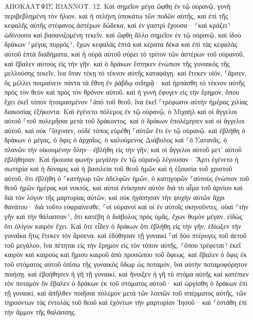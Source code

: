 \documentclass[twoside, 9pt]{extreport}
\begin{document}
ΑΠΟΚΑΛΥΨΙΣ ΙΩΑΝΝΟΥ.
12.
Καὶ σημεῖον μέγα ὤφθη ἐν τῷ οὐρανῷ, γυνὴ περιβεβλημένη τὸν ἥλιον, καὶ ἡ σελήνη ὑποκάτω τῶν ποδῶν αὐτῆς, καὶ ἐπὶ τῆς κεφαλῆς αὐτῆς στέφανος ἀστέρων δώδεκα, 
καὶ ἐν γαστρὶ ἔχουσα· ⸂καὶ κράζει⸃ ὠδίνουσα καὶ βασανιζομένη τεκεῖν. 
καὶ ὤφθη ἄλλο σημεῖον ἐν τῷ οὐρανῷ, καὶ ἰδοὺ δράκων ⸂μέγας πυρρός⸃, ἔχων κεφαλὰς ἑπτὰ καὶ κέρατα δέκα καὶ ἐπὶ τὰς κεφαλὰς αὐτοῦ ἑπτὰ διαδήματα, 
καὶ ἡ οὐρὰ αὐτοῦ σύρει τὸ τρίτον τῶν ἀστέρων τοῦ οὐρανοῦ, καὶ ἔβαλεν αὐτοὺς εἰς τὴν γῆν. καὶ ὁ δράκων ἕστηκεν ἐνώπιον τῆς γυναικὸς τῆς μελλούσης τεκεῖν, ἵνα ὅταν τέκῃ τὸ τέκνον αὐτῆς καταφάγῃ. 
καὶ ἔτεκεν υἱόν, ⸀ἄρσεν, ὃς μέλλει ποιμαίνειν πάντα τὰ ἔθνη ἐν ῥάβδῳ σιδηρᾷ· καὶ ἡρπάσθη τὸ τέκνον αὐτῆς πρὸς τὸν θεὸν καὶ πρὸς τὸν θρόνον αὐτοῦ. 
καὶ ἡ γυνὴ ἔφυγεν εἰς τὴν ἔρημον, ὅπου ἔχει ἐκεῖ τόπον ἡτοιμασμένον ⸀ἀπὸ τοῦ θεοῦ, ἵνα ἐκεῖ ⸀τρέφωσιν αὐτὴν ἡμέρας χιλίας διακοσίας ἑξήκοντα. 
Καὶ ἐγένετο πόλεμος ἐν τῷ οὐρανῷ, ὁ Μιχαὴλ καὶ οἱ ἄγγελοι αὐτοῦ ⸀τοῦ πολεμῆσαι μετὰ τοῦ δράκοντος. καὶ ὁ δράκων ἐπολέμησεν καὶ οἱ ἄγγελοι αὐτοῦ, 
καὶ οὐκ ⸀ἴσχυσεν, οὐδὲ τόπος εὑρέθη ⸀αὐτῶν ἔτι ἐν τῷ οὐρανῷ. 
καὶ ἐβλήθη ὁ δράκων ὁ μέγας, ὁ ὄφις ὁ ἀρχαῖος, ὁ καλούμενος Διάβολος καὶ ⸀ὁ Σατανᾶς, ὁ πλανῶν τὴν οἰκουμένην ὅλην—ἐβλήθη εἰς τὴν γῆν, καὶ οἱ ἄγγελοι αὐτοῦ μετ᾽ αὐτοῦ ἐβλήθησαν. 
Καὶ ἤκουσα φωνὴν μεγάλην ἐν τῷ οὐρανῷ λέγουσαν· Ἄρτι ἐγένετο ἡ σωτηρία καὶ ἡ δύναμις καὶ ἡ βασιλεία τοῦ θεοῦ ἡμῶν καὶ ἡ ἐξουσία τοῦ χριστοῦ αὐτοῦ, ὅτι ἐβλήθη ὁ ⸀κατήγωρ τῶν ἀδελφῶν ἡμῶν, ὁ κατηγορῶν ⸀αὐτοὺς ἐνώπιον τοῦ θεοῦ ἡμῶν ἡμέρας καὶ νυκτός. 
καὶ αὐτοὶ ἐνίκησαν αὐτὸν διὰ τὸ αἷμα τοῦ ἀρνίου καὶ διὰ τὸν λόγον τῆς μαρτυρίας αὐτῶν, καὶ οὐκ ἠγάπησαν τὴν ψυχὴν αὐτῶν ἄχρι θανάτου· 
διὰ τοῦτο εὐφραίνεσθε, ⸀οἱ οὐρανοὶ καὶ οἱ ἐν αὐτοῖς σκηνοῦντες. οὐαὶ ⸂τὴν γῆν καὶ τὴν θάλασσαν⸃, ὅτι κατέβη ὁ διάβολος πρὸς ὑμᾶς, ἔχων θυμὸν μέγαν, εἰδὼς ὅτι ὀλίγον καιρὸν ἔχει. 
Καὶ ὅτε εἶδεν ὁ δράκων ὅτι ἐβλήθη εἰς τὴν γῆν, ἐδίωξεν τὴν γυναῖκα ἥτις ἔτεκεν τὸν ἄρσενα. 
καὶ ἐδόθησαν τῇ γυναικὶ ⸀αἱ δύο πτέρυγες τοῦ ἀετοῦ τοῦ μεγάλου, ἵνα πέτηται εἰς τὴν ἔρημον εἰς τὸν τόπον αὐτῆς, ⸂ὅπου τρέφεται⸃ ἐκεῖ καιρὸν καὶ καιροὺς καὶ ἥμισυ καιροῦ ἀπὸ προσώπου τοῦ ὄφεως. 
καὶ ἔβαλεν ὁ ὄφις ἐκ τοῦ στόματος αὐτοῦ ὀπίσω τῆς γυναικὸς ὕδωρ ὡς ποταμόν, ἵνα αὐτὴν ποταμοφόρητον ποιήσῃ. 
καὶ ἐβοήθησεν ἡ γῆ τῇ γυναικί, καὶ ἤνοιξεν ἡ γῆ τὸ στόμα αὐτῆς καὶ κατέπιεν τὸν ποταμὸν ὃν ἔβαλεν ὁ δράκων ἐκ τοῦ στόματος αὐτοῦ· 
καὶ ὠργίσθη ὁ δράκων ἐπὶ τῇ γυναικί, καὶ ἀπῆλθεν ποιῆσαι πόλεμον μετὰ τῶν λοιπῶν τοῦ σπέρματος αὐτῆς, τῶν τηρούντων τὰς ἐντολὰς τοῦ θεοῦ καὶ ἐχόντων τὴν μαρτυρίαν Ἰησοῦ· 
καὶ ⸀ἐστάθη ἐπὶ τὴν ἄμμον τῆς θαλάσσης. 
\end{document}
